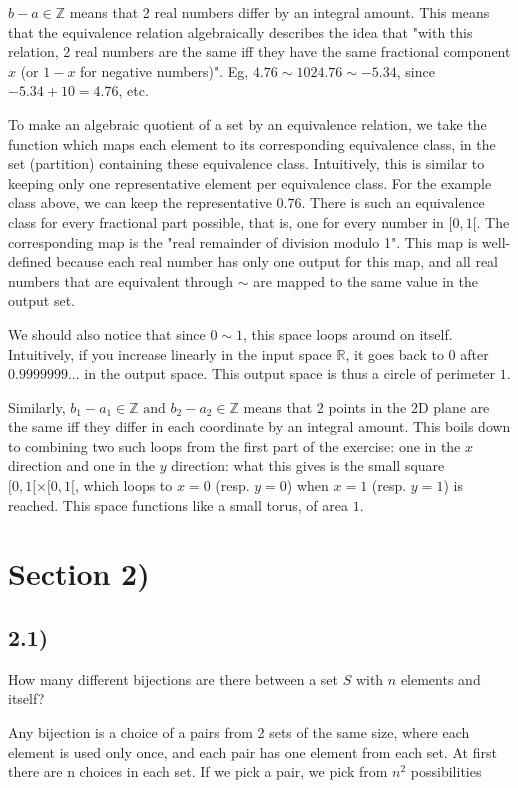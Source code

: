 \documentclass[12pt, letterpaper, twoside]{report}
\begin{document}
$b - a \in \mathbb{Z}$ means that 2 real numbers differ by an integral amount. This means that the equivalence relation algebraically describes the idea that "with this relation, 2 real numbers are the same iff they have the same fractional component $x$ (or $1 - x$ for negative numbers)". Eg, $4.76 \sim 1024.76 \sim -5.34$, since $-5.34 + 10 = 4.76$, etc.

To make an algebraic quotient of a set by an equivalence relation, we take the function which maps each element to its corresponding equivalence class, in the set (partition) containing these equivalence class. Intuitively, this is similar to keeping only one representative element per equivalence class. For the example class above, we can keep the representative $0.76$. There is such an equivalence class for every fractional part possible, that is, one for every number in $[0, 1[$. The corresponding map is the "real remainder of division modulo 1". This map is well-defined because each real number has only one output for this map, and all real numbers that are equivalent through $\sim$ are mapped to the same value in the output set.

We should also notice that since $0 \sim 1$, this space loops around on itself. Intuitively, if you increase linearly in the input space $\mathbb{R}$, it goes back to $0$ after $0.9999999...$ in the output space. This output space is thus a circle of perimeter $1$.

Similarly, $b_1 - a_1 \in \mathbb{Z} \text{ and } b_2 - a_2 \in \mathbb{Z}$ means that 2 points in the 2D plane are the same iff they differ in each coordinate by an integral amount. This boils down to combining two such loops from the first part of the exercise: one in the $x$ direction and one in the $y$ direction: what this gives is the small square $[0, 1[ \times [0, 1[$, which loops to $x = 0$ (resp. $y = 0$) when $x = 1$ (resp. $y = 1$) is reached. This space functions like a small torus, of area $1$.
\section*{Section 2)}

\subsection*{2.1)}

How many different bijections are there between a set $S$ with $n$ elements and itself?

Any bijection is a choice of a pairs from 2 sets of the same size, where each element is used only once, and each pair has one element from each set. At first there are n choices in each set. If we pick a pair, we pick from $n^2$ possibilities 
\end{document}
